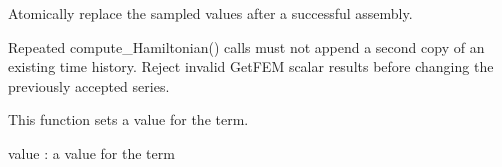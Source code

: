 \documentclass[letterpaper,10pt,english]{sphinxmanual}
\begin{document}
\begin{fulllineitems}
\begin{fulllineitems}
\begin{description}
\end{description}

\end{fulllineitems}


\begin{fulllineitems}
\label{\detokenize{scrimp:scrimp.hamiltonian.Term.replace_values}}
\pysigstartsignatures
\pysiglinewithargsret
{}
{}
{}
\pysigstopsignatures
\sphinxAtStartPar
Atomically replace the sampled values after a successful assembly.

\sphinxAtStartPar
Repeated compute\_Hamiltonian() calls must not append a second copy
of an existing time history. Reject invalid GetFEM scalar results
before changing the previously accepted series.

\end{fulllineitems}


\begin{fulllineitems}
\label{\detokenize{scrimp:scrimp.hamiltonian.Term.set_value}}
\pysigstartsignatures
\pysiglinewithargsret
{}
{}
{}
\pysigstopsignatures
\sphinxAtStartPar
This function sets a value for the term.
\begin{description}
\sphinxAtStartPar
value : a value for the term

\end{description}

\end{fulllineitems}


\end{fulllineitems}
\end{document}
